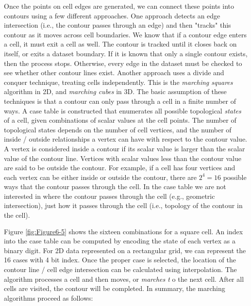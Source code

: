 Once the points on cell edges are generated, we can connect these points into contours using a few different approaches. One approach detects an edge intersection (i.e., the contour passes through an edge) and then "tracks" this contour as it moves across cell boundaries. We know that if a contour edge enters a cell, it must exit a cell as well. The contour is tracked until it closes back on itself, or exits a dataset boundary. If it is known that only a single contour exists, then the process stops. Otherwise, every edge in the dataset must be checked to see whether other contour lines exist. Another approach uses a divide and conquer technique, treating cells
independently. This is the \emph{marching squares} algorithm in 2D, and \emph{marching cubes} \cite{Lorensen87} in 3D. The basic assumption of these techniques is that a contour can only pass through a
cell in a finite number of ways. A case table is constructed that enumerates all possible topological \emph{states} of a cell, given combinations of scalar values at the cell points. The number of topological states depends on the number of cell vertices, and the number of inside / outside relationships a vertex can have with respect to the contour value. A vertex is considered inside a contour if its scalar value is larger than the scalar value of the contour line. Vertices with scalar values less than the contour value are said to be outside the contour. For example, if a cell has four vertices and each vertex can be either inside or outside the contour, there are $2^4 = 16$ possible ways that the contour passes through the cell. In the case table we are not interested in where the contour passes through the cell (e.g., geometric intersection), just how it passes through the cell (i.e., topology of the contour in the cell).

Figure \ref{fig:Figure6-5} shows the sixteen combinations for a square cell. An index into the case table can be computed by encoding the state of each vertex as a binary digit. For 2D data represented on a rectangular grid, we can represent the 16 cases with 4 bit index. Once the proper case is selected, the location of the contour line / cell edge intersection can be calculated using interpolation. The algorithm processes a cell and then moves, or \emph{marches t} o the next cell. After all cells are visited, the contour will be completed. In summary, the marching algorithms proceed as follows:

